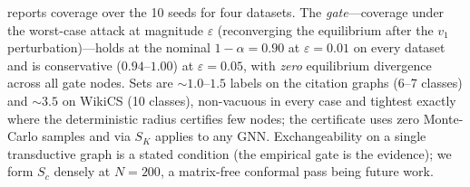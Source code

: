 
 reports coverage over the 10 seeds for four datasets. The \emph{gate}---coverage under the worst-case \AEGIS attack at magnitude $\varepsilon$ (reconverging the equilibrium after the $v_1$ perturbation)---holds at the nominal $1{-}\alpha{=}0.90$ at $\varepsilon{=}0.01$ on every dataset and is conservative ($0.94$--$1.00$) at $\varepsilon{=}0.05$, with \emph{zero} equilibrium divergence across all gate nodes. Sets are ${\sim}1.0$--$1.5$ labels on the citation graphs (6--7 classes) and ${\sim}3.5$ on WikiCS (10 classes), non-vacuous in every case and tightest exactly where the deterministic radius certifies few nodes; the certificate uses zero Monte-Carlo samples and via $S_K$ applies to any GNN. Exchangeability on a single transductive graph is a stated condition (the empirical gate is the evidence); we form $S_c$ densely at $N{=}200$, a matrix-free conformal pass being future work.

